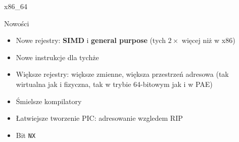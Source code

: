 \begin{frame}[fragile]{x86\_64}
	\begin{block}{Nowości}
		\begin{itemize}
			\item Nowe rejestry: \textbf{SIMD} i \textbf{general purpose} (tych $2\times$ więcej niż w x86)
			\item Nowe instrukcje dla tychże
			\item Większe rejestry: większe zmienne, większa przestrzeń adresowa (tak wirtualna jak i fizyczna, tak w trybie 64-bitowym jak i w PAE)
			\item Śmielsze kompilatory
			\item Łatwiejsze tworzenie PIC: adresowanie wzgledem RIP
			\item Bit \texttt{NX}
		\end{itemize}
	\end{block}
\end{frame}
